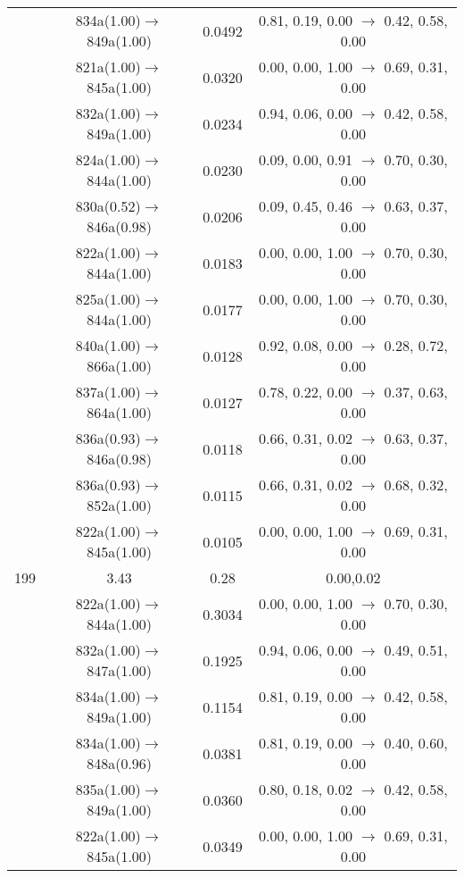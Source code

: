 \documentclass[10pt,a4paper]{article}
\begin{document}
\begin{longtable}{c|c|c|c}
 	& 834a(1.00)$\rightarrow$849a(1.00) &	 0.0492 &	 0.81, 0.19, 0.00 $\rightarrow$ 0.42, 0.58, 0.00 \\ 
 	& 821a(1.00)$\rightarrow$845a(1.00) &	 0.0320 &	 0.00, 0.00, 1.00 $\rightarrow$ 0.69, 0.31, 0.00 \\ 
 	& 832a(1.00)$\rightarrow$849a(1.00) &	 0.0234 &	 0.94, 0.06, 0.00 $\rightarrow$ 0.42, 0.58, 0.00 \\ 
 	& 824a(1.00)$\rightarrow$844a(1.00) &	 0.0230 &	 0.09, 0.00, 0.91 $\rightarrow$ 0.70, 0.30, 0.00 \\ 
 	& 830a(0.52)$\rightarrow$846a(0.98) &	 0.0206 &	 0.09, 0.45, 0.46 $\rightarrow$ 0.63, 0.37, 0.00 \\ 
 	& 822a(1.00)$\rightarrow$844a(1.00) &	 0.0183 &	 0.00, 0.00, 1.00 $\rightarrow$ 0.70, 0.30, 0.00 \\ 
 	& 825a(1.00)$\rightarrow$844a(1.00) &	 0.0177 &	 0.00, 0.00, 1.00 $\rightarrow$ 0.70, 0.30, 0.00 \\ 
 	& 840a(1.00)$\rightarrow$866a(1.00) &	 0.0128 &	 0.92, 0.08, 0.00 $\rightarrow$ 0.28, 0.72, 0.00 \\ 
 	& 837a(1.00)$\rightarrow$864a(1.00) &	 0.0127 &	 0.78, 0.22, 0.00 $\rightarrow$ 0.37, 0.63, 0.00 \\ 
 	& 836a(0.93)$\rightarrow$846a(0.98) &	 0.0118 &	 0.66, 0.31, 0.02 $\rightarrow$ 0.63, 0.37, 0.00 \\ 
 	& 836a(0.93)$\rightarrow$852a(1.00) &	 0.0115 &	 0.66, 0.31, 0.02 $\rightarrow$ 0.68, 0.32, 0.00 \\ 
 	& 822a(1.00)$\rightarrow$845a(1.00) &	 0.0105 &	 0.00, 0.00, 1.00 $\rightarrow$ 0.69, 0.31, 0.00 \\ 
 \hline199 &	 3.43 &	 0.28 &	 0.00,0.02 \\ 
  	& 822a(1.00)$\rightarrow$844a(1.00) &	 0.3034 &	 0.00, 0.00, 1.00 $\rightarrow$ 0.70, 0.30, 0.00 \\ 
 	& 832a(1.00)$\rightarrow$847a(1.00) &	 0.1925 &	 0.94, 0.06, 0.00 $\rightarrow$ 0.49, 0.51, 0.00 \\ 
 	& 834a(1.00)$\rightarrow$849a(1.00) &	 0.1154 &	 0.81, 0.19, 0.00 $\rightarrow$ 0.42, 0.58, 0.00 \\ 
 	& 834a(1.00)$\rightarrow$848a(0.96) &	 0.0381 &	 0.81, 0.19, 0.00 $\rightarrow$ 0.40, 0.60, 0.00 \\ 
 	& 835a(1.00)$\rightarrow$849a(1.00) &	 0.0360 &	 0.80, 0.18, 0.02 $\rightarrow$ 0.42, 0.58, 0.00 \\ 
 	& 822a(1.00)$\rightarrow$845a(1.00) &	 0.0349 &	 0.00, 0.00, 1.00 $\rightarrow$ 0.69, 0.31, 0.00 \\ 

\end{longtable}
\end{document}
